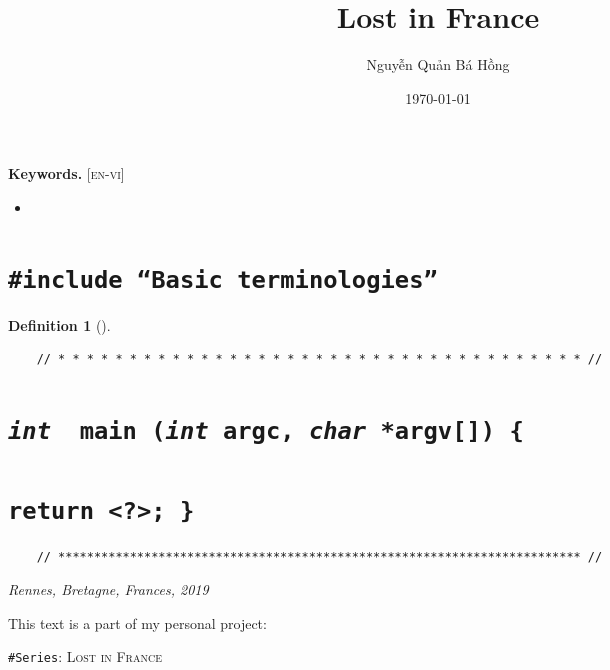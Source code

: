 \documentclass[12pt]{article}
\title{Lost in France}
\author{Nguyễn Quản Bá Hồng}
\date{\today}
\numberwithin{equation}{section}
\newtheorem{definition}{Definition}[section]
\begin{document}
\maketitle
\setcounter{secnumdepth}{6}
\setcounter{tocdepth}{6}


\begin{abstract}
    
\end{abstract}

\noindent
\textbf{Keywords.} [\textsc{en-vi}]
\begin{itemize}
    \setlength\itemsep{0em}
    \item 
\end{itemize}

\tableofcontents

\section{\texttt{{\color{RubineRed}\#include} ``Basic terminologies''}}

\begin{definition}[]
    
\end{definition}

\begin{verbatim}
    // * * * * * * * * * * * * * * * * * * * * * * * * * * * * * * * * * * * * * //
\end{verbatim}

\section{\texttt{{\color{cyan}\textit{int}} {\color{YellowGreen} main} ({\color{cyan}\textit{int}} argc, {\color{cyan}\textit{char}} *argv[]) \{}}

\section{\texttt{{\color{RubineRed}return} {\color{Purple}<?>}; \}}}


\begin{verbatim}
    // ************************************************************************* //
\end{verbatim}

\begin{flushright}
    \textit{Rennes, Bretagne, Frances, 2019}
    
    This text is a part of my personal project: 
    
    \texttt{\#Series}: \textsc{Lost in France}
\end{flushright}


\begin{thebibliography}{99}
    \bibitem[]{} 
    
    \bibitem[]{} 
\end{thebibliography}
\end{document}
